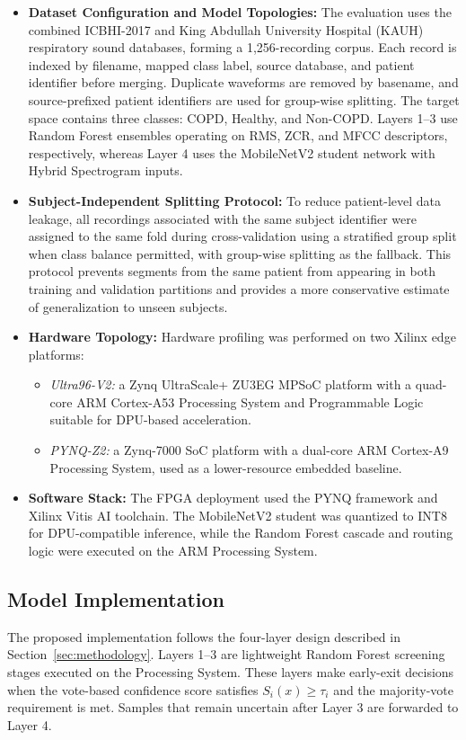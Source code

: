 \begin{itemize}
    \item \textbf{Dataset Configuration and Model Topologies:} The evaluation uses the combined ICBHI-2017 and King Abdullah University Hospital (KAUH) respiratory sound databases, forming a 1,256-recording corpus. Each record is indexed by filename, mapped class label, source database, and patient identifier before merging. Duplicate waveforms are removed by basename, and source-prefixed patient identifiers are used for group-wise splitting. The target space contains three classes: COPD, Healthy, and Non-COPD. Layers 1--3 use Random Forest ensembles operating on RMS, ZCR, and MFCC descriptors, respectively, whereas Layer 4 uses the MobileNetV2 student network with Hybrid Spectrogram inputs.

    \item \textbf{Subject-Independent Splitting Protocol:} To reduce patient-level data leakage, all recordings associated with the same subject identifier were assigned to the same fold during cross-validation using a stratified group split when class balance permitted, with group-wise splitting as the fallback. This protocol prevents segments from the same patient from appearing in both training and validation partitions and provides a more conservative estimate of generalization to unseen subjects.

    \item \textbf{Hardware Topology:} Hardware profiling was performed on two Xilinx edge platforms:
    \begin{itemize}
        \item \textit{Ultra96-V2:} a Zynq UltraScale+ ZU3EG MPSoC platform with a quad-core ARM Cortex-A53 Processing System and Programmable Logic suitable for DPU-based acceleration.
        \item \textit{PYNQ-Z2:} a Zynq-7000 SoC platform with a dual-core ARM Cortex-A9 Processing System, used as a lower-resource embedded baseline.
    \end{itemize}

    \item \textbf{Software Stack:} The FPGA deployment used the PYNQ framework and Xilinx Vitis AI toolchain. The MobileNetV2 student was quantized to INT8 for DPU-compatible inference, while the Random Forest cascade and routing logic were executed on the ARM Processing System.
\end{itemize}

\subsection{Model Implementation}
The proposed implementation follows the four-layer design described in Section~\ref{sec:methodology}. Layers 1--3 are lightweight Random Forest screening stages executed on the Processing System. These layers make early-exit decisions when the vote-based confidence score satisfies $S_i(x)\ge\tau_i$ and the majority-vote requirement is met. Samples that remain uncertain after Layer 3 are forwarded to Layer 4.

